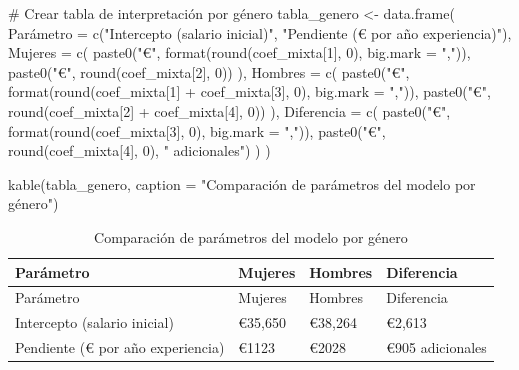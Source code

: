 \documentclass[
  letterpaper,
  DIV=11,
  numbers=noendperiod]{scrreprt}
\newenvironment{Shaded}{\begin{snugshade}}{\end{snugshade}}
\newcommand{\AttributeTok}[1]{\textcolor[rgb]{0.40,0.45,0.13}{#1}}
\newcommand{\CommentTok}[1]{\textcolor[rgb]{0.37,0.37,0.37}{#1}}
\newcommand{\DecValTok}[1]{\textcolor[rgb]{0.68,0.00,0.00}{#1}}
\newcommand{\FunctionTok}[1]{\textcolor[rgb]{0.28,0.35,0.67}{#1}}
\newcommand{\NormalTok}[1]{\textcolor[rgb]{0.00,0.23,0.31}{#1}}
\newcommand{\OtherTok}[1]{\textcolor[rgb]{0.00,0.23,0.31}{#1}}
\newcommand{\SpecialCharTok}[1]{\textcolor[rgb]{0.37,0.37,0.37}{#1}}
\newcommand{\StringTok}[1]{\textcolor[rgb]{0.13,0.47,0.30}{#1}}
\begin{document}
\begin{tcolorbox}
\begin{Shaded}
\begin{Highlighting}[]
\CommentTok{\# Crear tabla de interpretación por género}
\NormalTok{tabla\_genero }\OtherTok{\textless{}{-}} \FunctionTok{data.frame}\NormalTok{(}
\NormalTok{  Parámetro }\OtherTok{=} \FunctionTok{c}\NormalTok{(}\StringTok{"Intercepto (salario inicial)"}\NormalTok{, }\StringTok{"Pendiente (€ por año experiencia)"}\NormalTok{),}
  \AttributeTok{Mujeres =} \FunctionTok{c}\NormalTok{(}
    \FunctionTok{paste0}\NormalTok{(}\StringTok{"€"}\NormalTok{, }\FunctionTok{format}\NormalTok{(}\FunctionTok{round}\NormalTok{(coef\_mixta[}\DecValTok{1}\NormalTok{], }\DecValTok{0}\NormalTok{), }\AttributeTok{big.mark =} \StringTok{","}\NormalTok{)),}
    \FunctionTok{paste0}\NormalTok{(}\StringTok{"€"}\NormalTok{, }\FunctionTok{round}\NormalTok{(coef\_mixta[}\DecValTok{2}\NormalTok{], }\DecValTok{0}\NormalTok{))}
\NormalTok{  ),}
  \AttributeTok{Hombres =} \FunctionTok{c}\NormalTok{(}
    \FunctionTok{paste0}\NormalTok{(}\StringTok{"€"}\NormalTok{, }\FunctionTok{format}\NormalTok{(}\FunctionTok{round}\NormalTok{(coef\_mixta[}\DecValTok{1}\NormalTok{] }\SpecialCharTok{+}\NormalTok{ coef\_mixta[}\DecValTok{3}\NormalTok{], }\DecValTok{0}\NormalTok{), }\AttributeTok{big.mark =} \StringTok{","}\NormalTok{)),}
    \FunctionTok{paste0}\NormalTok{(}\StringTok{"€"}\NormalTok{, }\FunctionTok{round}\NormalTok{(coef\_mixta[}\DecValTok{2}\NormalTok{] }\SpecialCharTok{+}\NormalTok{ coef\_mixta[}\DecValTok{4}\NormalTok{], }\DecValTok{0}\NormalTok{))}
\NormalTok{  ),}
  \AttributeTok{Diferencia =} \FunctionTok{c}\NormalTok{(}
    \FunctionTok{paste0}\NormalTok{(}\StringTok{"€"}\NormalTok{, }\FunctionTok{format}\NormalTok{(}\FunctionTok{round}\NormalTok{(coef\_mixta[}\DecValTok{3}\NormalTok{], }\DecValTok{0}\NormalTok{), }\AttributeTok{big.mark =} \StringTok{","}\NormalTok{)),}
    \FunctionTok{paste0}\NormalTok{(}\StringTok{"€"}\NormalTok{, }\FunctionTok{round}\NormalTok{(coef\_mixta[}\DecValTok{4}\NormalTok{], }\DecValTok{0}\NormalTok{), }\StringTok{" adicionales"}\NormalTok{)}
\NormalTok{  )}
\NormalTok{)}

\FunctionTok{kable}\NormalTok{(tabla\_genero, }
      \AttributeTok{caption =} \StringTok{"Comparación de parámetros del modelo por género"}\NormalTok{)}
\end{Highlighting}
\end{Shaded}

\begin{longtable}[]{@{}llll@{}}
\caption{Comparación de parámetros del modelo por género}\tabularnewline
\toprule\noalign{}
Parámetro & Mujeres & Hombres & Diferencia \\
\midrule\noalign{}
\endfirsthead
\toprule\noalign{}
Parámetro & Mujeres & Hombres & Diferencia \\
\midrule\noalign{}
\endhead
\bottomrule\noalign{}
\endlastfoot
Intercepto (salario inicial) & €35,650 & €38,264 & €2,613 \\
Pendiente (€ por año experiencia) & €1123 & €2028 & €905 adicionales \\
\end{longtable}


\end{tcolorbox}
\end{document}
